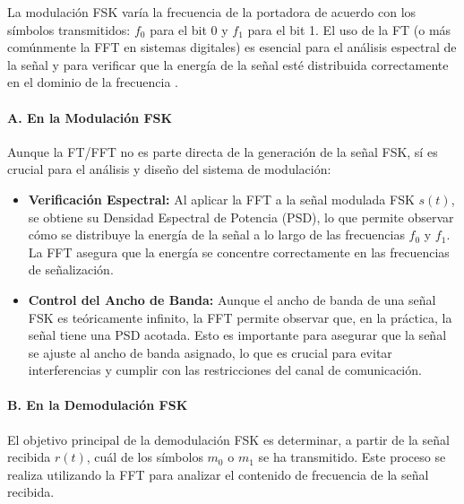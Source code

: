 \documentclass[letter,12pt]{article}
\begin{document}
La modulación FSK varía la frecuencia de la portadora de acuerdo con los símbolos transmitidos: \( f_0 \) para el bit 0 y \( f_1 \) para el bit 1. El uso de la FT (o más comúnmente la FFT en sistemas digitales) es esencial para el análisis espectral de la señal y para verificar que la energía de la señal esté distribuida correctamente en el dominio de la frecuencia \cite{McCune2010}.

\paragraph{A. En la Modulación FSK}

Aunque la FT/FFT no es parte directa de la generación de la señal FSK, sí es crucial para el análisis y diseño del sistema de modulación:

\begin{itemize}
    \item \textbf{Verificación Espectral:} Al aplicar la FFT a la señal modulada FSK \( s(t) \), se obtiene su Densidad Espectral de Potencia (PSD), lo que permite observar cómo se distribuye la energía de la señal a lo largo de las frecuencias \( f_0 \) y \( f_1 \). La FFT asegura que la energía se concentre correctamente en las frecuencias de señalización\cite{McCune2010}.
    \item \textbf{Control del Ancho de Banda:} Aunque el ancho de banda de una señal FSK es teóricamente infinito, la FFT permite observar que, en la práctica, la señal tiene una PSD acotada. Esto es importante para asegurar que la señal se ajuste al ancho de banda asignado, lo que es crucial para evitar interferencias y cumplir con las restricciones del canal de comunicación\cite{McCune2010}.
\end{itemize}

\paragraph{B. En la Demodulación FSK}

El objetivo principal de la demodulación FSK es determinar, a partir de la señal recibida \( r(t) \), cuál de los símbolos \( m_0 \) o \( m_1 \) se ha transmitido. Este proceso se realiza utilizando la FFT para analizar el contenido de frecuencia de la señal recibida\cite{McCune2010}.
\end{document}
